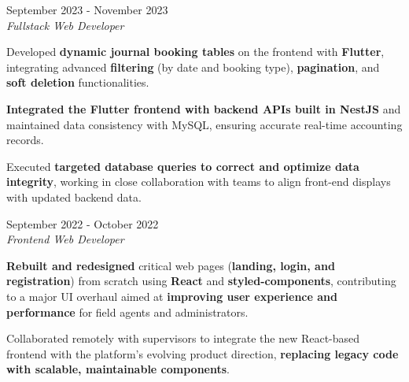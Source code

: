 \documentclass[../main.tex]{subfiles}
\begin{document}
\vspace{0.4 cm}

\begin{twocolentry}{September 2023 - November 2023}
     \\
    \vspace{0.10 cm}
    \textit{Fullstack Web Developer}
\end{twocolentry}

\vspace{0.10 cm}
\begin{onecolentry}
\begin{highlights}
    \item Developed \textbf{dynamic journal booking tables} on the frontend with \textbf{Flutter}, integrating advanced \textbf{filtering} (by date and booking type), \textbf{pagination}, and \textbf{soft deletion} functionalities.
    \item \textbf{Integrated the Flutter frontend with backend APIs built in NestJS} and maintained data consistency with MySQL, ensuring accurate real-time accounting records.
    \item Executed \textbf{targeted database queries to correct and optimize data integrity}, working in close collaboration with teams to align front-end displays with updated backend data.
\end{highlights}
\end{onecolentry}

\vspace{0.4 cm}

\begin{twocolentry}{September 2022 - October 2022}
     \\
    \vspace{0.10 cm}
    \textit{Frontend Web Developer}
\end{twocolentry}

\vspace{0.10 cm}
\begin{onecolentry}
\begin{highlights}
    \item \textbf{Rebuilt and redesigned} critical web pages (\textbf{landing, login, and registration}) from scratch using \textbf{React} and \textbf{styled-components}, contributing to a major UI overhaul aimed at \textbf{improving user experience and performance} for field agents and administrators.
    \item Collaborated remotely with supervisors to integrate the new React-based frontend with the platform’s evolving product direction, \textbf{replacing legacy code with scalable, maintainable components}.
\end{highlights}
\end{onecolentry}
\end{document}
